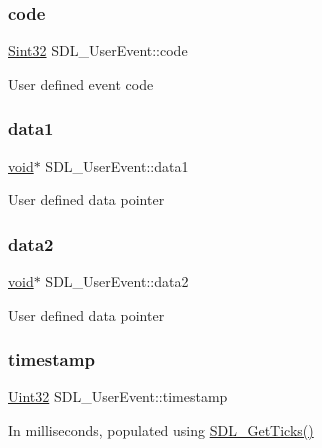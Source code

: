 \subsubsection{\texorpdfstring{code}{code}}
{\footnotesize\ttfamily \hyperlink{_s_d_l__stdinc_8h_a7a90b941db9d4582e9ad7abb9940ff7e}{Sint32} S\+D\+L\+\_\+\+User\+Event\+::code}

User defined event code \mbox{\label{struct_s_d_l___user_event_ab2893a12be2f97195f16463a23107913}} 
\subsubsection{\texorpdfstring{data1}{data1}}
{\footnotesize\ttfamily \hyperlink{_s_d_l__opengles2__gl2ext_8h_ae5d8fa23ad07c48bb609509eae494c95}{void}$\ast$ S\+D\+L\+\_\+\+User\+Event\+::data1}

User defined data pointer \mbox{\label{struct_s_d_l___user_event_aae4dbf65c34d654c9edf519eb061b7cf}} 
\subsubsection{\texorpdfstring{data2}{data2}}
{\footnotesize\ttfamily \hyperlink{_s_d_l__opengles2__gl2ext_8h_ae5d8fa23ad07c48bb609509eae494c95}{void}$\ast$ S\+D\+L\+\_\+\+User\+Event\+::data2}

User defined data pointer \mbox{\label{struct_s_d_l___user_event_adbf1d34c73138a0c549310e5d4ad0c35}} 
\subsubsection{\texorpdfstring{timestamp}{timestamp}}
{\footnotesize\ttfamily \hyperlink{_s_d_l__stdinc_8h_add440eff171ea5f55cb00c4a9ab8672d}{Uint32} S\+D\+L\+\_\+\+User\+Event\+::timestamp}

In milliseconds, populated using \hyperlink{_s_d_l__timer_8h_a0b9bc71d6287e0ffafdc3419760fe2b3}{S\+D\+L\+\_\+\+Get\+Ticks()} \mbox{\label{struct_s_d_l___user_event_ab7afa8b98dbd7b52bef41155e10f7340}} 
